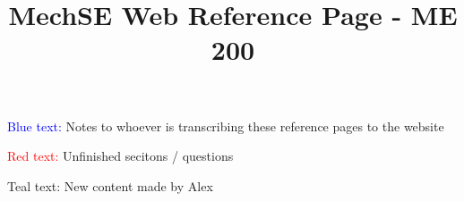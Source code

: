 \documentclass{article}
\title{MechSE Web Reference Page - ME 200}
\date
\newcommand{\red}[1]{\textcolor{red}{#1}}
\newcommand{\blue}[1]{\textcolor{blue}{#1}}
\newcommand{\teal}[1]{\textcolor{Dteal}{#1}}
\begin{document}
\maketitle
\blue{Blue text:} Notes to whoever is transcribing these reference pages to the website

\red{Red text:} Unfinished secitons / questions

\teal{Teal text:} New content made by Alex
\tableofcontents
\newpage











\end{document}
